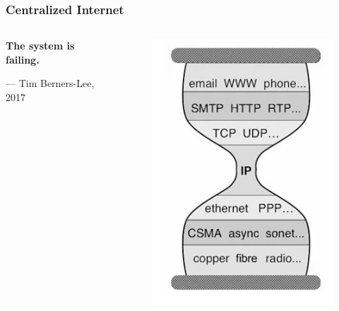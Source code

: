 \begin{frame}
\frametitle{ Centralized Internet }
\begin{columns}[T] %
\begin{column}{5cm} %
  \begin{minipage}[c][0.5 \textheight][c]{\linewidth}
    \textbf{The system is failing.\cite{bernerslee2017}}
    \begin{flushright}
     --- Tim Berners-Lee, 2017
    \end{flushright}
  \end{minipage}
\end{column}
\begin{column}{5cm} %
  \begin{figure}[h]
  \centering
  \includegraphics[width=0.7\linewidth]{hourglass.png}
  \end{figure}
\end{column}
\end{columns}
\end{frame}


